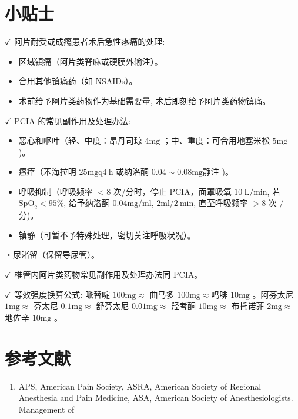 \documentclass[10pt]{article}
\begin{document}
\section*{小贴士}
$\checkmark$ 阿片耐受或成瘾患者术后急性疼痛的处理:

\begin{itemize}
  \item 区域镇痛（阿片类脊麻或硬膜外输注）。
  \item 合用其他镇痛药（如 NSAIDs）。
  \item 术前给予阿片类药物作为基础需要量, 术后即刻给予阿片类药物镇痛。
\end{itemize}

$\checkmark$ PCIA 的常见副作用及处理办法:

\begin{itemize}
  \item 恶心和呕叶（轻、中度：昂丹司琼 $4 \mathrm{mg}$ ；中、重度：可合用地塞米松 $5 \mathrm{mg}$ )。
  \item 瘙㾕（苯海拉明 $25 \mathrm{mg} \mathrm{q} 4 \mathrm{~h}$ 或纳洛酮 $0.04 \sim 0.08 \mathrm{mg}$静注 )。
  \item 呼吸抑制（呼吸频率 $<8$ 次/分时，停止 PCIA，面罩吸氧 $10 \mathrm{~L} / \mathrm{min}$, 若 $\mathrm{SpO}_{2}<95 \%$, 给予纳洛酮 $0.04 \mathrm{mg} / \mathrm{ml}$, $2 \mathrm{ml} / 2 \mathrm{~min}$, 直至呼吸频率 $>8$ 次 $/$ 分)。
  \item 镇静（可暂不予特殊处理，密切关注呼吸状况）。
\end{itemize}

・尿渚留（保留导尿管）。

$\checkmark$ 椎管内阿片类药物常见副作用及处理办法同 PCIA。

$\checkmark$ 等效强度换算公式: 哌替啶 $100 \mathrm{mg} \approx$ 曲马多 $100 \mathrm{mg} \approx$吗啡 $10 \mathrm{mg}$ 。阿芬太尼 $1 \mathrm{mg} \approx$ 芬太尼 $0.1 \mathrm{mg} \approx$ 舒芬太尼 $0.01 \mathrm{mg} \approx$ 羟考酮 $10 \mathrm{mg} \approx$ 布托诺菲 $2 \mathrm{mg} \approx$ 地佐辛 $10 \mathrm{mg}$ 。

\section*{参考文献}
\begin{enumerate}
  \item APS, American Pain Society, ASRA, American Society of Regional Anesthesia and Pain Medicine, ASA, American Society of Anesthesiologists. Management of
\end{enumerate}
\end{document}
